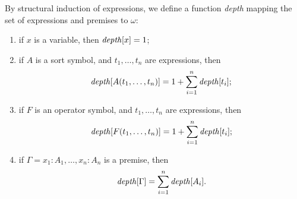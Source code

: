 \begin{definition}
    By structural induction of expressions, we define a function \textit{depth} mapping 
    the set of expressions and premises to $\omega$:
    \begin{enumerate}
        \item if $x$ is a variable, then $\operatorname{\mathit{depth}}[x] = 1$;
        \item if $A$ is a sort symbol, and $t_1, \dots, t_n$ are expressions, then \[
            \operatorname{\mathit{depth}}[A(t_1, \dots, t_n)] = 1 + \sum_{i = 1}^n \operatorname{\mathit{depth}}[t_i];
        \]
        \item if $F$ is an operator symbol, and $t_1, \dots, t_n$ are expressions, then \[
            \operatorname{\mathit{depth}}[F(t_1, \dots, t_n)] = 1 + \sum_{i=1}^n \operatorname{\mathit{depth}}[t_i];
        \]
        \item if $\Gamma = x_1 \colon A_1, \dots, x_n \colon A_n$ is a premise, then \[
            \operatorname{\mathit{depth}}[\Gamma] = \sum_{i = 1}^n \operatorname{\mathit{depth}}[A_i].
        \]
    \end{enumerate}
\end{definition}

